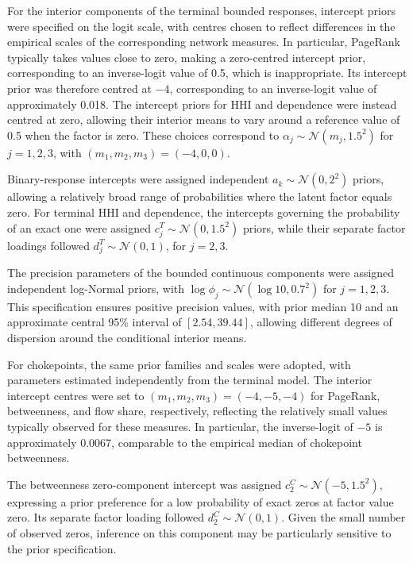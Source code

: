 \documentclass[pdftex,12pt,openright,a4paper,oneside]{book}
\begin{document}
For the interior components of the terminal bounded responses,
intercept priors were specified on the logit scale, with centres
chosen to reflect differences in the empirical scales of the
corresponding network measures. In particular, PageRank
typically takes values close to zero, making a zero-centred
intercept prior, corresponding to an inverse-logit value of
0.5, which is inappropriate. Its intercept prior was therefore centred
at $-4$, corresponding to an inverse-logit value of approximately
0.018. The intercept priors for HHI and dependence were instead
centred at zero, allowing their interior means to vary around
a reference value of 0.5 when the factor is zero. These choices
correspond to $\alpha_j\sim\mathcal{N}(m_j,1.5^2)$ for
$j=1,2,3$, with $(m_1,m_2,m_3)=(-4,0,0)$.

Binary-response intercepts were assigned independent
$a_k\sim\mathcal{N}(0,2^2)$ priors, allowing a relatively broad
range of probabilities where the latent factor equals zero. For terminal HHI
and dependence, the intercepts governing the probability of
an exact one were assigned
$c_j^T\sim\mathcal{N}(0,1.5^2)$ priors, while their separate
factor loadings followed $d_j^T\sim\mathcal{N}(0,1)$,
for $j=2,3$.

The precision parameters of the bounded continuous components
were assigned independent log-Normal priors, with
$\log\phi_j\sim\mathcal{N}(\log 10,0.7^2)$ for $j=1,2,3$.
This specification ensures positive precision values, with
prior median 10 and an approximate central 95\% interval of
$[2.54,39.44]$, allowing different degrees of dispersion around
the conditional interior means.

For chokepoints, the same prior families and scales were
adopted, with parameters estimated independently from the
terminal model. The interior intercept centres were set to
$(m_1,m_2,m_3)=(-4,-5,-4)$ for PageRank, betweenness, and flow
share, respectively, reflecting the relatively small values
typically observed for these measures. In particular, the
inverse-logit of $-5$ is approximately 0.0067, comparable to
the empirical median of chokepoint betweenness.

The betweenness zero-component intercept was assigned
$c_2^C\sim\mathcal{N}(-5,1.5^2)$, expressing a prior preference
for a low probability of exact zeros at factor value zero.
Its separate factor loading followed
$d_2^C\sim\mathcal{N}(0,1)$. Given the small number of observed
zeros, inference on this component may be particularly
sensitive to the prior specification.
\end{document}

